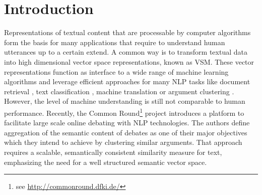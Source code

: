 \section{Introduction} %

Representations of textual content that are processable by computer algorithms form the basis for many applications that require to understand human utterances up to a certain extend. A common way is to transform textual data into high dimensional vector space representations, known as \ac{VSM}\autocite{salton_vector_1975}. These vector representations function as interface to a wide range of machine learning algorithms and leverage efficient approaches for many \ac{NLP} tasks like document retrieval \autocite{manning_introduction_2008}, text classification \autocite{sahami_bayesian_1998}, machine translation \autocite{wu_googles_2016} or argument clustering \autocite{boltuzic_identifying_2015}. However, the level of machine understanding is still not comparable to human performance. Recently, the Common Round\footnote{see \url{http://commonround.dfki.de/}} project \autocite{uszkoreit_common_2017} introduces a platform to facilitate large scale online debating with \ac{NLP} technologies. The authors define aggregation of the semantic content of debates as one of their major objectives which they intend to achieve by clustering similar arguments. That approach requires a scalable, semantically consistent similarity measure for text, emphasizing the need for a well structured semantic vector space. 

